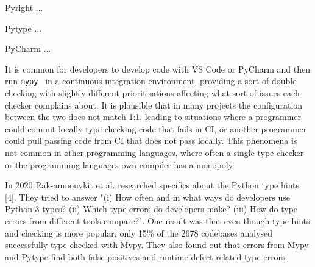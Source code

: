 Pyright ... 

Pytype ...

PyCharm ...


It is common for developers to develop code with VS Code or PyCharm and then run {\tt mypy } in a continuous integration environment, providing a sort of double checking with slightly different prioritisations affecting what sort of issues each checker complains about. It is plausible that in many projects the configuration between the two does not match 1:1, leading to situations where a programmer could commit locally type checking code that fails in CI, or another programmer could pull passing code from CI that does not pass locally. This phenomena is not common in other programming languages, where often a single type checker or the programming languages own compiler has a monopoly.

In 2020 Rak-amnouykit et al. researched specifics about the Python type hints [4]. They tried to answer "(i) How often and in what ways do developers use Python 3 types? (ii) Which type errors do developers make? (iii) How do type errors from different tools compare?". One result was that even though type hints and checking is more popular, only 15\% of the 2678 codebases analysed successfully type checked with Mypy. They also found out that errors from Mypy and Pytype find both false positives and runtime defect related type errors.

